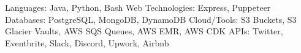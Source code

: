 
\begin{cvskills}

  \cvskill
    {Languages:}
    {Java, Python, Bash}
   \cvskill
    {Web Technologies:}  
    {Express, Puppeteer}
   \cvskill
    {Databases:}  
    {PostgreSQL, MongoDB, DynamoDB}
   \cvskill
    {Cloud/Tools:}  
    {S3 Buckets, S3 Glacier Vaults, AWS SQS Queues, AWS EMR, AWS CDK}
   \cvskill
    {APIs:}  
    {Twitter, Eventbrite, Slack, Discord, Upwork, Airbnb}
\end{cvskills}

